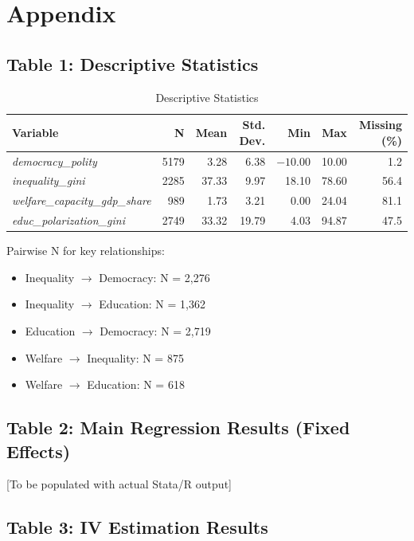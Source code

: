 \documentclass[11pt,letterpaper]{article}
\begin{document}
\newpage
\appendix
\section{Appendix}

\subsection{Table 1: Descriptive Statistics}

\begin{table}[!htbp]
\centering
\caption{Descriptive Statistics}
\begin{tabular}{lrrrrrr}
\hline
Variable & N & Mean & Std. Dev. & Min & Max & Missing (\%) \\
\hline
\textit{democracy\_polity} & 5179 & 3.28 & 6.38 & $-10.00$ & 10.00 & 1.2 \\
\textit{inequality\_gini} & 2285 & 37.33 & 9.97 & 18.10 & 78.60 & 56.4 \\
\textit{welfare\_capacity\_gdp\_share} & 989 & 1.73 & 3.21 & 0.00 & 24.04 & 81.1 \\
\textit{educ\_polarization\_gini} & 2749 & 33.32 & 19.79 & 4.03 & 94.87 & 47.5 \\
\hline
\end{tabular}
\label{tab:desc_stats}
\end{table}

\noindent Pairwise N for key relationships:
\begin{itemize}
\item Inequality $\rightarrow$ Democracy: N = 2,276
\item Inequality $\rightarrow$ Education: N = 1,362
\item Education $\rightarrow$ Democracy: N = 2,719
\item Welfare $\rightarrow$ Inequality: N = 875
\item Welfare $\rightarrow$ Education: N = 618
\end{itemize}

\subsection{Table 2: Main Regression Results (Fixed Effects)}

[To be populated with actual Stata/R output]

\subsection{Table 3: IV Estimation Results}
\end{document}
